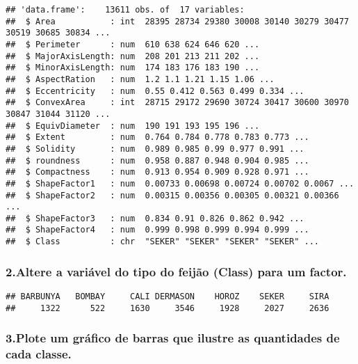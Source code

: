 \documentclass[
]{article}
\newenvironment{Shaded}{\begin{snugshade}}{\end{snugshade}}
\newcommand{\FunctionTok}[1]{\textcolor[rgb]{0.00,0.00,0.00}{#1}}
\newcommand{\NormalTok}[1]{#1}
\newcommand{\OtherTok}[1]{\textcolor[rgb]{0.56,0.35,0.01}{#1}}
\newcommand{\SpecialCharTok}[1]{\textcolor[rgb]{0.00,0.00,0.00}{#1}}
\begin{document}
\begin{verbatim}
## 'data.frame':    13611 obs. of  17 variables:
##  $ Area           : int  28395 28734 29380 30008 30140 30279 30477 30519 30685 30834 ...
##  $ Perimeter      : num  610 638 624 646 620 ...
##  $ MajorAxisLength: num  208 201 213 211 202 ...
##  $ MinorAxisLength: num  174 183 176 183 190 ...
##  $ AspectRation   : num  1.2 1.1 1.21 1.15 1.06 ...
##  $ Eccentricity   : num  0.55 0.412 0.563 0.499 0.334 ...
##  $ ConvexArea     : int  28715 29172 29690 30724 30417 30600 30970 30847 31044 31120 ...
##  $ EquivDiameter  : num  190 191 193 195 196 ...
##  $ Extent         : num  0.764 0.784 0.778 0.783 0.773 ...
##  $ Solidity       : num  0.989 0.985 0.99 0.977 0.991 ...
##  $ roundness      : num  0.958 0.887 0.948 0.904 0.985 ...
##  $ Compactness    : num  0.913 0.954 0.909 0.928 0.971 ...
##  $ ShapeFactor1   : num  0.00733 0.00698 0.00724 0.00702 0.0067 ...
##  $ ShapeFactor2   : num  0.00315 0.00356 0.00305 0.00321 0.00366 ...
##  $ ShapeFactor3   : num  0.834 0.91 0.826 0.862 0.942 ...
##  $ ShapeFactor4   : num  0.999 0.998 0.999 0.994 0.999 ...
##  $ Class          : chr  "SEKER" "SEKER" "SEKER" "SEKER" ...
\end{verbatim}

\hypertarget{altere-a-variuxe1vel-do-tipo-do-feijuxe3o-class-para-um-factor.}{%
\subsubsection{2.Altere a variável do tipo do feijão (Class) para um
factor.}\label{altere-a-variuxe1vel-do-tipo-do-feijuxe3o-class-para-um-factor.}}

\begin{Shaded}
\end{Shaded}

\begin{verbatim}
## BARBUNYA   BOMBAY     CALI DERMASON    HOROZ    SEKER     SIRA 
##     1322      522     1630     3546     1928     2027     2636
\end{verbatim}

\hypertarget{plote-um-gruxe1fico-de-barras-que-ilustre-as-quantidades-de-cada-classe.}{%
\subsubsection{3.Plote um gráfico de barras que ilustre as quantidades
de cada
classe.}\label{plote-um-gruxe1fico-de-barras-que-ilustre-as-quantidades-de-cada-classe.}}
\end{document}
